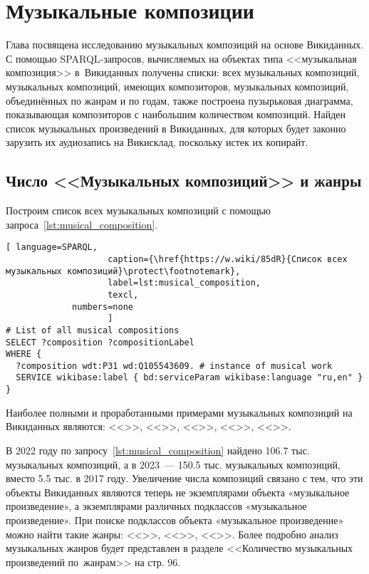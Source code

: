 \chapter{Музыкальные композиции}
\label{ch:musical-composition}
Глава посвящена исследованию музыкальных композиций на основе Викиданных. С помощью SPARQL-запросов, вычисляемых на объектах типа <<музыкальная композиция>> в~Викиданных получены списки: всех музыкальных композиций, музыкальных композиций, имеющих композиторов, музыкальных композиций, объединённых по жанрам и по годам, также построена пузырьковая диаграмма, показывающая композиторов с наибольшим количеством композиций. Найден список музыкальных произведений в Викиданных, для которых будет законно зарузить их аудиозапись на Викисклад, поскольку истек их копирайт.

\section{Число <<Музыкальных композиций>> и жанры}


Построим список всех музыкальных композиций с помощью запроса~\ref{lst:musical_composition}.

\begin{lstlisting}[ language=SPARQL,
                    caption={\href{https://w.wiki/85dR}{Список всех  музыкальных композиций}\protect\footnotemark},
                    label=lst:musical_composition,
                    texcl,
	         numbers=none
                    ]
# List of all musical compositions
SELECT ?composition ?compositionLabel 
WHERE {
  ?composition wdt:P31 wd:Q105543609. # instance of musical work
  SERVICE wikibase:label { bd:serviceParam wikibase:language "ru,en" }
}
\end{lstlisting}%

Наиболее полными и проработанными примерами музыкальных композиций на Викиданных являются: <<>>, <<>>, <<>>, <<>>, <<>>.

В 2022 году по запросу~\ref{lst:musical_composition} найдено \num{106,7} тыс. музыкальных композиций, а в 2023~--- \num{150,5} тыс. музыкальных композиций, вместо \num{5,5} тыс. в 2017 году. Увеличение числа композиций связано с тем, что эти объекты Викиданных являются теперь не экземплярами объекта «музыкальное произведение», а экземплярами различных подклассов «музыкальное произведение». При поиске подклассов объекта «музыкальное произведение» можно найти такие жанры: <<>>, <<>>, <<>>. Более подробно анализ музыкальных жанров будет представлен в разделе <<Количество музыкальных произведений по~жанрам>> на стр. 96.


